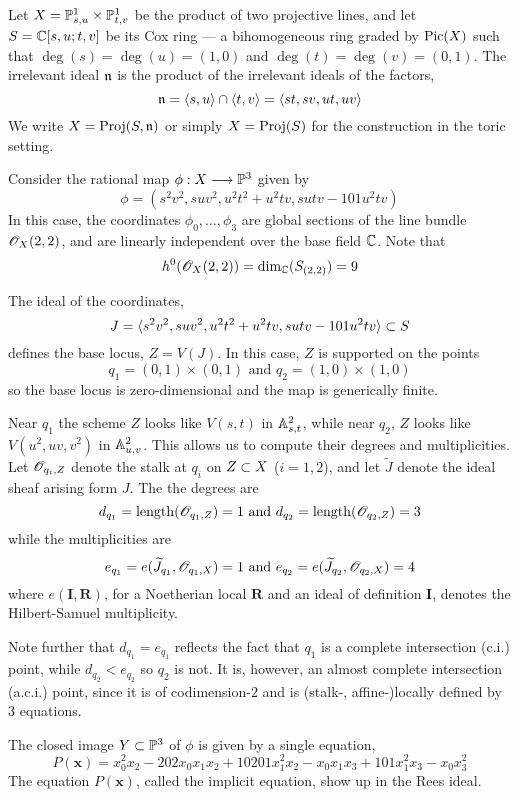 \documentclass[fleqn,reqno]{amsart}
\begin{document}
\begin{example}[$\mt{ex201}$]
\label{ex201}
Let $X=\PP^1_{s,u}\times\PP^1_{t,v}$ be the product of two projective lines,
and let $S=\CC[s,u;t,v]$ be its Cox ring --- a bihomogeneous ring graded by $\Pic(X)$
such that $\deg(s)=\deg(u)=(1,0)$ and $\deg(t)=\deg(v)=(0,1)$.
The irrelevant ideal $\n$ is the product of the irrelevant ideals of the factors,
\[
	\n=\la s,u\ra\cap\la t,v\ra=\la st,sv,ut,uv\ra
\]
We write $X=\Proj(S,\n)$ or simply $X=\Proj(S)$ for the construction in the toric setting.

Consider the rational map $\phi:X\To\PP^3$ given by
\[
	\phi=(s^{2} v^{2},s u v^{2},u^{2} t^{2}+u^{2} t v,s u t v-101 u^{2}t v)
\]
In this case, the coordinates $\phi_0,\ldots,\phi_3$ are global sections
of the line bundle $\O_X(2,2)$, and are linearly independent over the base field $\CC$.
Note that
\[
	h^0(\O_X(2,2))=\dim_\CC(S_{(2,2)})=9
\]

The ideal of the coordinates,
\[
	J=\la s^{2} v^{2},s u v^{2},u^{2} t^{2}+u^{2} t v,s u t v-101 u^{2}t v\ra\se S
\]
defines the base locus, $Z=V(J)$.
In this case, $Z$ is supported on the points
\[
	q_1=(0,1)\times(0,1) \text{ and } q_2=(1,0)\times(1,0)
\]
so the base locus is zero-dimensional and the map is generically finite.

Near $q_1$ the scheme $Z$ looks like $V(s,t)$ in $\AA^2_{s,t}$,
while near $q_2$, $Z$ looks like $V(u^2,uv,v^2)$ in $\AA^2_{u,v}$.
This allows us to compute their degrees and multiplicities.
Let $\O_{q_i,Z}$ denote the stalk at $q_i$ on $Z\se X$ ($i=1,2$),
and let $\widetilde J$ denote the ideal sheaf arising form $J$.
The the degrees are
\[
	d_{q_1}=\length(\O_{q_1,Z})=1 \text{ and } d_{q_2}=\length(\O_{q_2,Z})=3
\]
while the multiplicities are
\[
	e_{q_1}=e(\widetilde{J}_{q_1},\O_{q_1,X})=1 \text{ and } e_{q_2}=e(\widetilde{J}_{q_2},\O_{q_2,X})=4
\]
where $e(\mathbf I,\mathbf R)$,
for a Noetherian local $\mathbf R$ and an ideal of definition $\mathbf I$,
denotes the Hilbert-Samuel multiplicity.

Note further that $d_{q_1}=e_{q_1}$ reflects the fact that $q_1$ is a complete intersection
(c.i.) point,
while $d_{q_2}<e_{q_2}$ so $q_2$ is not.
It is, however, an almost complete intersection (a.c.i.) point,
since it is of codimension-$2$ and is (stalk-, affine-)locally defined by $3$ equations.

The closed image $Y\se\PP^3$ of $\phi$ is given by a single equation,
\[
	P(\mathbf x)={x}_{0}^{2} {x}_{2}-202 {x}_{0} {x}_{1} {x}_{2}+10201
  {x}_{1}^{2} {x}_{2}-{x}_{0} {x}_{1} {x}_{3}+101 {x}_{1}^{2} {x}_{3}-{x}_{0}
  {x}_{3}^{2}
\]
The equation $P(\mathbf x)$, called the implicit equation, show up in the Rees ideal.


\end{example}
\end{document}
